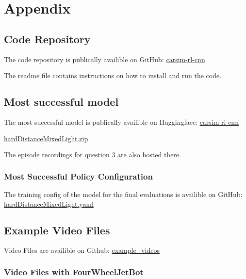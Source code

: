 \chapter{Appendix}
\label{cha:Appendix}

\section{Code Repository}

The code repository is publically availible on GitHub: 
\href{https://github.com/geschnee/carsim-rl-cnn}{carsim-rl-cnn}

The readme file contains instructions on how to install and run the code.

\section{Most successful model}

The most successful model is publically availible on Huggingface: 
\href{https://huggingface.co/geschnee/carsim-rl-cnn}{carsim-rl-cnn}

\href{https://huggingface.co/geschnee/carsim-rl-cnn/blob/main/models/hardDistanceMixedLight.zip}{hardDistanceMixedLight.zip}

The episode recordings for question 3 are also hosted there.


\subsection{Most Successful Policy Configuration}
\label{cha:most_successful_config}

The training config of the model for the final evaluations is availible on GitHub: 
\href{https://github.com/geschnee/carsim-rl-cnn/tree/main/python/cfg/hardDistanceMixedLight.yaml}{hardDistanceMixedLight.yaml}

\section{Example Video Files}
\label{cha:example_videos}

Video Files are availible on Github: 
\href{https://github.com/geschnee/carsim-rl-cnn/tree/main/python/results/example_videos}{example\_videos}

\subsection{Video Files with FourWheelJetBot}

